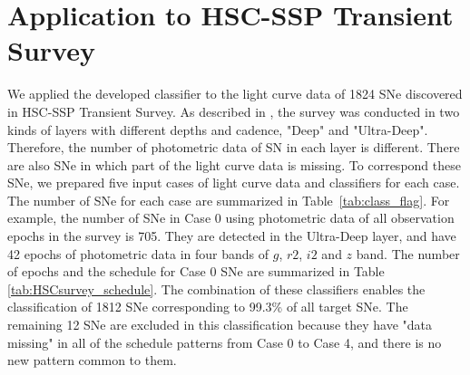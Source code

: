 \documentclass[useamsfonts]{pasj01}
\begin{document}
\section{Application to HSC-SSP Transient Survey}
\label{sec:h}
%
We applied the developed classifier to the light curve data of 1824 SNe discovered in HSC-SSP Transient Survey.
As described in \citet{yasuda19a}, the survey %
was conducted in two kinds of layers with different depths and cadence, 
"Deep" and "Ultra-Deep".
Therefore, the number of photometric data of SN in each layer is different.
There are also SNe in which part of the light curve data is missing.
To correspond these SNe, we prepared five input cases of light curve data and classifiers for each case.
The number of SNe for each case are summarized in Table\ \ref{tab:class_flag}.
For example, the number of SNe in Case 0 using photometric data of all observation epochs in the survey is 705.
They are detected in the Ultra-Deep layer, and have 42 epochs of photometric data in four bands of $g$, $r2$, $i2$ and $z$ band.
The number of epochs and the schedule for Case 0 SNe are summarized in Table \ref{tab:HSCsurvey_schedule}.
The combination of these classifiers enables the classification of 1812 SNe corresponding to 99.3\% of all target SNe.
The remaining 12 SNe are excluded in this classification because they have "data missing" in all of the schedule patterns from Case 0 to Case 4, and there is no new pattern common to them.
\end{document}
